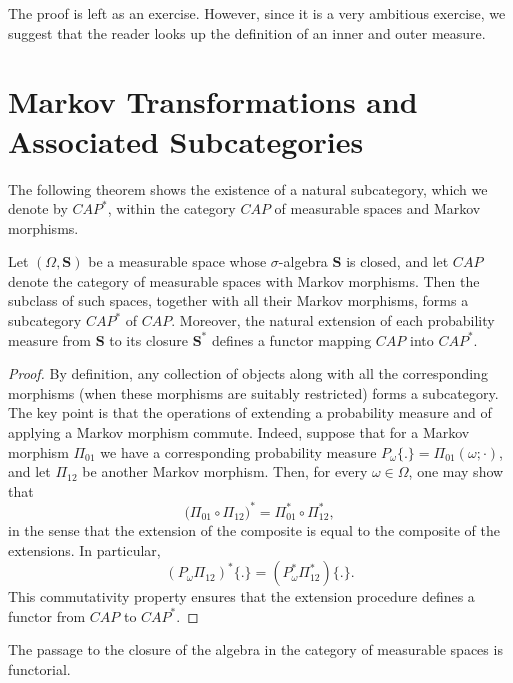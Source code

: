 \begin{ex}\label{Ex:ProofThm7.2}
The proof is left as an exercise. However, since it is a very ambitious exercise, we suggest that the reader looks up the definition of an inner and outer measure. 
\end{ex}


\section{Markov Transformations and Associated Subcategories}

The following theorem shows the existence of a natural subcategory, which we denote by $CAP^*$, within the category $CAP$ of measurable spaces and Markov morphisms.

\begin{theorem}
Let $(\Omega, \mathbf{S})$ be a measurable space whose $\sigma$-algebra $\mathbf{S}$ is closed, and let $CAP$ denote the category of measurable spaces with Markov morphisms. Then the subclass of such spaces, together with all their Markov morphisms, forms a subcategory $CAP^*$ of $CAP$. Moreover, the natural extension of each probability measure from $\mathbf{S}$ to its closure $\mathbf{S}^*$ defines a functor mapping $CAP$ into $CAP^*$.
\end{theorem}

\begin{proof}
By definition, any collection of objects along with all the corresponding morphisms (when these morphisms are suitably restricted) forms a subcategory. The key point is that the operations of extending a probability measure and of applying a Markov morphism commute. Indeed, suppose that for a Markov morphism $\Pi_{01}$ we have a corresponding probability measure $P_\omega\{.\} = \Pi_{01}(\omega; \cdot)$, and let $\Pi_{12}$ be another Markov morphism. Then, for every $\omega \in \Omega$, one may show that
\[
\bigl( \Pi_{01} \circ \Pi_{12} \bigr)^* = \Pi_{01}^* \circ \Pi_{12}^*,
\]
in the sense that the extension of the composite is equal to the composite of the extensions. In particular, 
\[
(P_\omega \Pi_{12})^*\{.\} = (P_\omega^* \Pi_{12}^*)\{.\}.
\]
This commutativity property ensures that the extension procedure defines a functor from $CAP$ to $CAP^*$.
\end{proof}

\begin{remark}
The passage to the closure of the algebra in the category of measurable spaces is functorial.
\end{remark}

